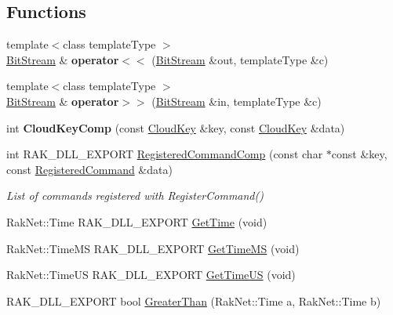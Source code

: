 \subsection*{Functions}
\begin{DoxyCompactItemize}
\item 
\hypertarget{namespace_rak_net_a57d7db23f2d4a6e02a19603ab037ed8a}{{\footnotesize template$<$class template\-Type $>$ }\\\hyperlink{class_rak_net_1_1_bit_stream}{Bit\-Stream} \& {\bfseries operator$<$$<$} (\hyperlink{class_rak_net_1_1_bit_stream}{Bit\-Stream} \&out, template\-Type \&c)}\label{namespace_rak_net_a57d7db23f2d4a6e02a19603ab037ed8a}

\item 
\hypertarget{namespace_rak_net_afdad5692051ffd2c59e62cdb9ad0efa5}{{\footnotesize template$<$class template\-Type $>$ }\\\hyperlink{class_rak_net_1_1_bit_stream}{Bit\-Stream} \& {\bfseries operator$>$$>$} (\hyperlink{class_rak_net_1_1_bit_stream}{Bit\-Stream} \&in, template\-Type \&c)}\label{namespace_rak_net_afdad5692051ffd2c59e62cdb9ad0efa5}

\item 
\hypertarget{namespace_rak_net_a9d6dc5ec4b40f9d533487e4b47966d26}{int {\bfseries Cloud\-Key\-Comp} (const \hyperlink{struct_rak_net_1_1_cloud_key}{Cloud\-Key} \&key, const \hyperlink{struct_rak_net_1_1_cloud_key}{Cloud\-Key} \&data)}\label{namespace_rak_net_a9d6dc5ec4b40f9d533487e4b47966d26}

\item 
\hypertarget{namespace_rak_net_a10d1d43d98fc240d38ff39f47dd29db0}{int R\-A\-K\-\_\-\-D\-L\-L\-\_\-\-E\-X\-P\-O\-R\-T \hyperlink{namespace_rak_net_a10d1d43d98fc240d38ff39f47dd29db0}{Registered\-Command\-Comp} (const char $\ast$const \&key, const \hyperlink{struct_rak_net_1_1_registered_command}{Registered\-Command} \&data)}\label{namespace_rak_net_a10d1d43d98fc240d38ff39f47dd29db0}

\begin{DoxyCompactList}\small\item\em List of commands registered with Register\-Command() \end{DoxyCompactList}\item 
Rak\-Net\-::\-Time R\-A\-K\-\_\-\-D\-L\-L\-\_\-\-E\-X\-P\-O\-R\-T \hyperlink{namespace_rak_net_a45ef68c020ce6b8086e7a412b5767a04}{Get\-Time} (void)
\item 
Rak\-Net\-::\-Time\-M\-S R\-A\-K\-\_\-\-D\-L\-L\-\_\-\-E\-X\-P\-O\-R\-T \hyperlink{namespace_rak_net_ada73d8160aa36bffbba9e3eb092147cc}{Get\-Time\-M\-S} (void)
\item 
Rak\-Net\-::\-Time\-U\-S R\-A\-K\-\_\-\-D\-L\-L\-\_\-\-E\-X\-P\-O\-R\-T \hyperlink{namespace_rak_net_a0eb59672707865b233dd68a54db6c59f}{Get\-Time\-U\-S} (void)
\item 
\hypertarget{namespace_rak_net_a9da89622bfe0aa11286137d97cacd535}{R\-A\-K\-\_\-\-D\-L\-L\-\_\-\-E\-X\-P\-O\-R\-T bool \hyperlink{namespace_rak_net_a9da89622bfe0aa11286137d97cacd535}{Greater\-Than} (Rak\-Net\-::\-Time a, Rak\-Net\-::\-Time b)}\label{namespace_rak_net_a9da89622bfe0aa11286137d97cacd535}


\end{DoxyCompactItemize}
